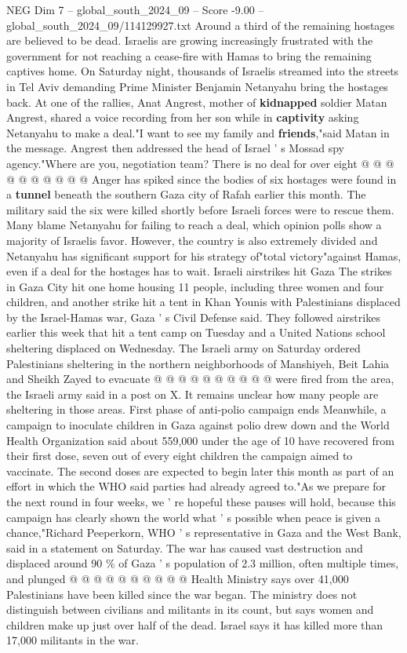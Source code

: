 \begin{textsample}{NEG Dim 7 – global\_south\_2024\_09 – Score -9.00 – global\_south\_2024\_09/114129927.txt}
Around a third of the remaining hostages are believed to be dead.
Israelis are growing increasingly frustrated with the government for not reaching a cease-fire with Hamas to bring the remaining captives home.
On Saturday night, thousands of Israelis streamed into the streets in Tel Aviv demanding Prime Minister Benjamin Netanyahu bring the hostages back.
At one of the rallies, Anat Angrest, mother of \textbf{kidnapped} soldier Matan Angrest, shared a voice recording from her son while in \textbf{captivity} asking Netanyahu to make a deal."I want to see my family and \textbf{friends},"said Matan in the message.
Angrest then addressed the head of Israel ' s Mossad spy agency."Where are you, negotiation team?
There is no deal for over eight @ @ @ @ @ @ @ @ @ @ Anger has spiked since the bodies of six hostages were found in a \textbf{tunnel} beneath the southern Gaza city of Rafah earlier this month.
The military said the six were killed shortly before Israeli forces were to rescue them.
Many blame Netanyahu for failing to reach a deal, which opinion polls show a majority of Israelis favor.
However, the country is also extremely divided and Netanyahu has significant support for his strategy of"total victory"against Hamas, even if a deal for the hostages has to wait.
Israeli airstrikes hit Gaza The strikes in Gaza City hit one home housing 11 people, including three women and four children, and another strike hit a tent in Khan Younis with Palestinians displaced by the Israel-Hamas war, Gaza ' s Civil Defense said.
They followed airstrikes earlier this week that hit a tent camp on Tuesday and a United Nations school sheltering displaced on Wednesday.
The Israeli army on Saturday ordered Palestinians sheltering in the northern neighborhoods of Manshiyeh, Beit Lahia and Sheikh Zayed to evacuate @ @ @ @ @ @ @ @ @ @ were fired from the area, the Israeli army said in a post on X.
It remains unclear how many people are sheltering in those areas.
First phase of anti-polio campaign ends Meanwhile, a campaign to inoculate children in Gaza against polio drew down and the World Health Organization said about 559,000 under the age of 10 have recovered from their first dose, seven out of every eight children the campaign aimed to vaccinate.
The second doses are expected to begin later this month as part of an effort in which the WHO said parties had already agreed to."As we prepare for the next round in four weeks, we ' re hopeful these pauses will hold, because this campaign has clearly shown the world what ' s possible when peace is given a chance,"Richard Peeperkorn, WHO ' s representative in Gaza and the West Bank, said in a statement on Saturday.
The war has caused vast destruction and displaced around 90 \% of Gaza ' s population of 2.3 million, often multiple times, and plunged @ @ @ @ @ @ @ @ @ @ Health Ministry says over 41,000 Palestinians have been killed since the war began.
The ministry does not distinguish between civilians and militants in its count, but says women and children make up just over half of the dead.
Israel says it has killed more than 17,000 militants in the war.

\end{textsample}
